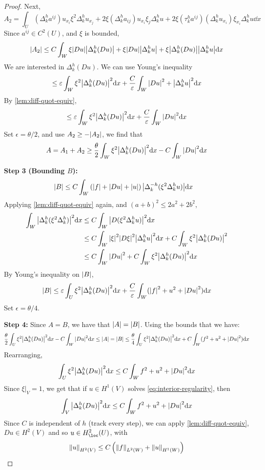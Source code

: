 \documentclass{article}
\begin{document}
\begin{proof}
    Next,
    \[A_2 = \int_U(\Delta_k^h a^{ij})u_{x_i}\xi^2\Delta_k^hu_{x_j} + 2 \xi(\Delta_k^h a_{ij})u_{x_i}\xi_j\Delta_k^h u + 2 \xi(\tau_k^ha^{ij})(\Delta_k^hu_{x_i})\xi_{x_i}\Delta_k^hu \dd x\]
    Since \(a^{ij} \in C^2(U)\), and \(\xi\) is bounded,
    \[\abs{A_2} \le C \int_W \xi\abs{Du}\abs{\Delta_k^h(Du)} + \xi\abs{Du}\abs{\Delta_k^hu} + \xi\abs{\Delta_k^h(Du)}\abs{\Delta_k^h u}\dd x\]
    We are interested in \(\Delta_k^h(Du)\). We can use Young's inequality
    \[\le \varepsilon\int_W \xi^2\abs{\Delta_k^h(D u)}^2 \dd x + \frac{C}{\varepsilon}\int_W\abs{Du}^2 + \abs{\Delta_k^hu}^2 \dd x\]
    By \cref{lem:diff-quot-equiv},
    \[\le \varepsilon\int_W\xi^2\abs{\Delta_k^h(Du)}^2 \dd x + \frac{C}{\varepsilon}\int_W\abs{Du}^2 \dd x\]
    Set \(\epsilon = \theta/2\), and use \(A_2 \ge -\abs{A_2}\), we find that
    \[A = A_1 + A_2 \ge \frac{\theta}{2}\int_W\xi^2\abs{\Delta_k^h(D u)}^2 \dd x - C \int_W\abs{Du}^2 \dd x\]

    \textbf{Step 3 (Bounding \(B\)):}
    \begin{align*}
        \abs{B} &\le C\int_W \left(\abs{f} + \abs{Du} + \abs{u}\right)\abs{\Delta_k^{-h}(\xi^2\Delta_k^h u)} \dd x
    \end{align*}
    Applying \cref{lem:diff-quot-equiv} again, and \((a + b)^2 \le 2a^2 + 2b^2\),
    \begin{align*}
        \int_W\abs{\Delta_k^h(\xi^2\Delta_k^h)}^2 \dd x &\le C\int_W\abs{D(\xi^2\Delta_k^hu)}^2 \dd x \\
        &\le C\int_W\abs{\xi}^2 \abs{D\xi}^2 \abs{\Delta_k^hu}^2 \dd x + C \int_W \xi^2 \abs{\Delta_k^h(Du)}^2 \\
        &\le C\int_W \abs{Du}^2 + C \int_W \xi^2 \abs{\Delta_k^h(Du)}^2 \dd x
    \end{align*}
    By Young's inequality on \(\abs{B}\),
    \[\abs{B} \le \varepsilon\int_U \xi^2\abs{\Delta_k^h(Du)}^2 \dd x + \frac{C}{\varepsilon}\int_W(\abs{f}^2 + u^2 + \abs{D u}^2) \dd x\]
    Set \(\epsilon = \theta/4\).

    \textbf{Step 4:} Since \(A = B\), we have that \(\abs{A} = \abs{B}\). Using the bounds that we have:
    \[\frac{\theta}{2}\int_U\xi^2\abs{\Delta_k^h(D u)}^2 \dd x - C \int_W\abs{Du}^2 \dd x \le \abs{A} = \abs{B} \le \frac{\theta}{4}\int_U \xi^2 \abs{\Delta_k^h(Du)}^2 \dd x + C \int_W(f^2 + u^2 + \abs{Du}^2)\dd x\]
    Rearranging,
    \[\int_U\xi^2 \abs{\Delta_k^h(Du)}^2 \dd x \le C \int_Wf^2 + u^2 + \abs{Du}^2 \dd x\]
    Since \(\xi\vert_V = 1\), we get that if \(u \in H^1(V)\) solves \cref{eq:interior-regularity}, then
    \[\int_V \abs{\Delta_k^h(Du)}^2 \dd x \le C \int_W f^2 + u^2 + \abs{Du}^2 \dd x\]
    Since \(C\) is independent of \(h\) (track every step), we can apply \cref{lem:diff-quot-equiv}, \(Du \in H^2(V)\) and so \(u \in H^2_\loc(U)\), with
    \[\norm{u}_{H^2(V)} \le C \left(\norm{f}_{L^2(W)} + \norm{u}_{H^1(W)}\right)\]


\end{proof}
\end{document}
